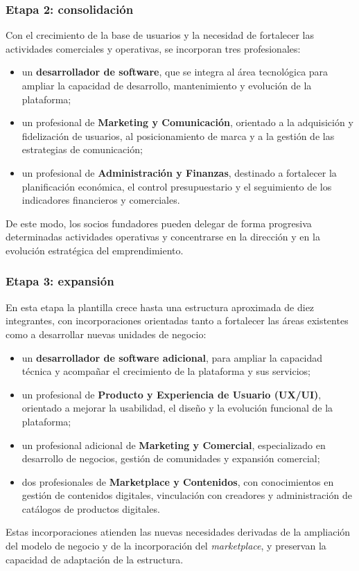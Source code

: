 \subsubsection{Etapa 2: consolidación}
Con el crecimiento de la base de usuarios y la necesidad de fortalecer las actividades comerciales y operativas, se incorporan tres profesionales:
\begin{itemize}
  \item un \textbf{desarrollador de software}, que se integra al área tecnológica para ampliar la capacidad de desarrollo, mantenimiento y evolución de la plataforma;
  \item un profesional de \textbf{Marketing y Comunicación}, orientado a la adquisición y fidelización de usuarios, al posicionamiento de marca y a la gestión de las estrategias de comunicación;
  \item un profesional de \textbf{Administración y Finanzas}, destinado a fortalecer la planificación económica, el control presupuestario y el seguimiento de los indicadores financieros y comerciales.
\end{itemize}
De este modo, los socios fundadores pueden delegar de forma progresiva determinadas actividades operativas y concentrarse en la dirección y en la evolución estratégica del emprendimiento.

\subsubsection{Etapa 3: expansión}
En esta etapa la plantilla crece hasta una estructura aproximada de diez integrantes, con incorporaciones orientadas tanto a fortalecer las áreas existentes como a desarrollar nuevas unidades de negocio:
\begin{itemize}
  \item un \textbf{desarrollador de software adicional}, para ampliar la capacidad técnica y acompañar el crecimiento de la plataforma y sus servicios;
  \item un profesional de \textbf{Producto y Experiencia de Usuario (UX/UI)}, orientado a mejorar la usabilidad, el diseño y la evolución funcional de la plataforma;
  \item un profesional adicional de \textbf{Marketing y Comercial}, especializado en desarrollo de negocios, gestión de comunidades y expansión comercial;
  \item dos profesionales de \textbf{Marketplace y Contenidos}, con conocimientos en gestión de contenidos digitales, vinculación con creadores y administración de catálogos de productos digitales.
\end{itemize}
Estas incorporaciones atienden las nuevas necesidades derivadas de la ampliación del modelo de negocio y de la incorporación del \textit{marketplace}, y preservan la capacidad de adaptación de la estructura.


